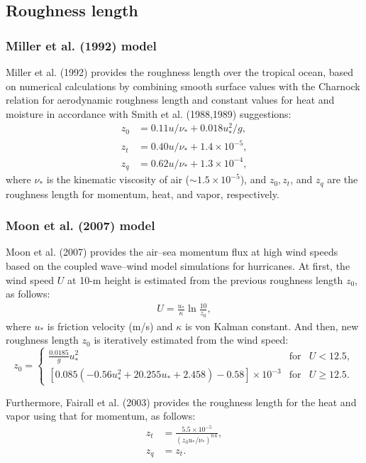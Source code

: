 \subsection{Roughness length}
\subsubsection{Miller et al. (1992) model}
Miller et al. (1992) provides the roughness length over the tropical ocean,
based on numerical calculations by combining smooth surface values
with the Charnock relation for aerodynamic roughness length
and constant values for heat and moisture in accordance with Smith et al. (1988,1989) suggestions:
\begin{align}
  z_0 &= 0.11u/\nu_* + 0.018u_*^2/g, \label{eq: z_0} \\
  z_t &= 0.40u/\nu_* + 1.4 \times 10^{-5}, \label{eq: z_t} \\
  z_q &= 0.62u/\nu_* + 1.3 \times 10^{-4}, \label{eq: z_q}
\end{align}
where $\nu_*$ is the kinematic viscosity of air ($\sim 1.5 \times 10^{-5}$), and $z_0, z_t$,
and $z_q$ are the roughness length for momentum, heat, and vapor, respectively.

\subsubsection{Moon et al. (2007) model}
Moon et al. (2007) provides the air--sea momentum flux at high wind speeds
based on the coupled wave--wind model simulations for hurricanes.
At first, the wind speed $U$ at 10-m height is estimated from the previous roughness length $z_0$, as follows:
\begin{align}
  U =\frac{u_{*}}{\kappa} \ln \frac{10}{z_0},
\end{align}
where
$u_{*}$ is friction velocity (m/s)
and $\kappa$ is von Kalman constant.
And then, new roughness length $z_0$ is iteratively estimated from the wind speed:
\begin{equation}
  z_0   = \left\{
  \begin{array}{lll}
    \frac{0.0185}{g} u_{*}^2 & \mathrm{for} & U < 12.5, \\
    \left[ 0.085 \left( -0.56 u_{*}^2 + 20.255 u_{*} + 2.458 \right) - 0.58 \right] \times 10^{-3} & \mathrm{for} & U \ge 12.5.
   \end{array} \right.
\end{equation}

Furthermore, Fairall et al. (2003) provides the roughness length for the heat and vapor
using that for momentum, as follows:
\begin{align}
  z_t &= \frac{ 5.5 \times 10^{-5} }{ ( z_0 u_{*} / \nu_{*} )^{0.6} }, \\
  z_q &= z_t.
\end{align}

